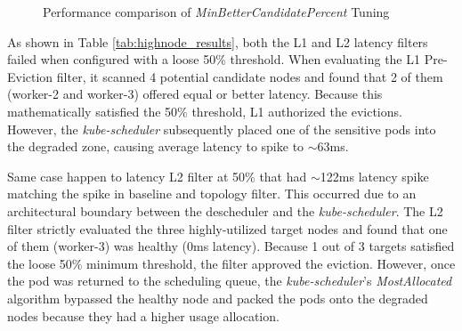 \begin{figure}[H]
    \caption{Performance comparison of \textit{MinBetterCandidatePercent} Tuning}
    \label{fig:highnode_results}
\end{figure}

As shown in Table \ref{tab:highnode_results}, both the L1 and L2 latency filters failed when configured with a loose 50\% threshold. When evaluating the L1 Pre-Eviction filter, it scanned 4 potential candidate nodes and found that 2 of them (worker-2 and worker-3) offered equal or better latency. Because this mathematically satisfied the 50\% threshold, L1 authorized the evictions. However, the \textit{kube-scheduler} subsequently placed one of the sensitive pods into the degraded zone, causing average latency to spike to $\sim$63ms.

Same case happen to latency L2 filter at 50\% that had $\sim$122ms latency spike matching the spike in baseline and topology filter. This occurred due to an architectural boundary between the descheduler and the \textit{kube-scheduler}. The L2 filter strictly evaluated the three highly-utilized target nodes and found that one of them (worker-3) was healthy (0ms latency). Because 1 out of 3 targets satisfied the loose 50\% minimum threshold, the filter approved the eviction. However, once the pod was returned to the scheduling queue, the \textit{kube-scheduler}'s \textit{MostAllocated} algorithm bypassed the healthy node and packed the pods onto the degraded nodes because they had a higher usage allocation. 

